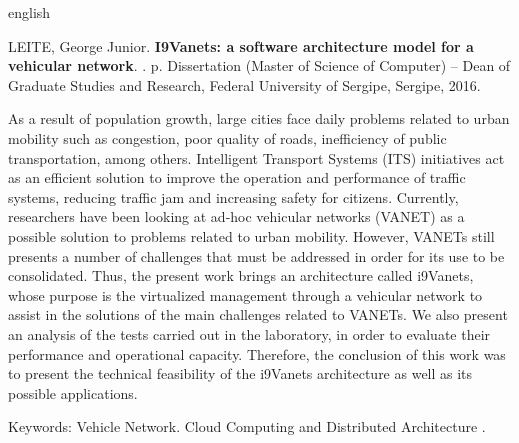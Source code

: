 \documentclass[
	12pt,				%
	oneside,			%
	a4paper,			%
	english,			%
	brazil				%
	]{abntex2ppgsi}
\begin{document}
% 
% 
\begin{resumo}[Abstract]
\begin{otherlanguage*}{english}

% 
%
%
%
\begin{flushleft}
LEITE, George Junior. \textbf{I9Vanets: a software architecture model for a vehicular network}. \imprimirdata. \pageref{LastPage} p. Dissertation (Master of Science of Computer) – Dean of Graduate Studies and Research, Federal University of Sergipe, Sergipe, 2016. 
\end{flushleft}

As a result of population growth, large cities face daily problems related to urban mobility such as congestion, poor quality of roads, inefficiency of public transportation, among others. Intelligent Transport Systems (ITS) initiatives act as an efficient solution to improve the operation and performance of traffic systems, reducing traffic jam and increasing safety for citizens. Currently, researchers have been looking at ad-hoc vehicular networks (VANET) as a possible solution to problems related to urban mobility. However, VANETs still presents a number of challenges that must be addressed in order for its use to be consolidated. Thus, the present work brings an architecture called i9Vanets, whose purpose is the virtualized management through a vehicular network to assist in the solutions of the main challenges related to VANETs. We also present an analysis of the tests carried out in the laboratory, in order to evaluate their performance and operational capacity. Therefore, the conclusion of this work was to present the technical feasibility of the i9Vanets architecture as well as its possible applications.

Keywords: Vehicle Network. Cloud Computing and Distributed Architecture .
\end{otherlanguage*}
\end{resumo}
\end{document}
